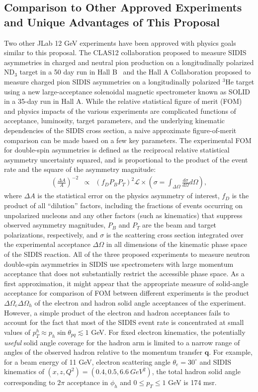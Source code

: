 \subsection{Comparison to Other Approved Experiments and Unique Advantages of This Proposal}
Two other JLab 12 GeV experiments have been approved with physics goals similar to this proposal. The CLAS12 collaboration proposed to measure SIDIS asymmetries in charged and neutral pion production on a longitudinally polarized ND$_3$ target in a 50 day run in Hall B~\cite{CLAS12_ND3_longitudinal} and the Hall A Collaboration proposed to measure charged pion SIDIS asymmetries on a longitudinally polarized $^3$He target using a new large-acceptance solenoidal magnetic spectrometer known as SOLID~\cite{SOLID_He3_longitudinal} in a 35-day run in Hall A. While the relative statistical figure of merit (FOM) and physics impacts of the various experiments are complicated functions of acceptance, luminosity, target parameters, and the underlying kinematic dependencies of the SIDIS cross section, a naive approximate figure-of-merit comparison can be made based on a few key parameters. The experimental FOM for double-spin asymmetries is defined as the reciprocal relative statistical asymmetry uncertainty squared, and is proportional to the product of the event rate and the square of the asymmetry magnitude: 
\begin{eqnarray}
  \left(\frac{\Delta A}{A}\right)^{-2} &\propto& (f_D P_B P_T)^2 \mathcal{L} \times \left( \sigma = \int_{\Delta \Omega} \frac{d\sigma}{d\Omega} d \Omega \right), 
\end{eqnarray} 
where $\Delta A$ is the statistical error on the physics asymmetry of interest, $f_D$ is the product of all ``dilution'' factors, including the fractions of events occurring on unpolarized nucleons and any other factors (such as kinematics) that suppress observed asymmetry magnitudes, $P_B$ and $P_T$ are the beam and target polarizations, respectively, and $\sigma$ is the scattering cross section integrated over the experimental acceptance $\Delta \Omega$ in all dimensions of the kinematic phase space of the SIDIS reaction. All of the three proposed experiments to measure neutron double-spin asymmetries in SIDIS use spectrometers with large momentum acceptance that does not substantially restrict the accessible phase space. As a first approximation, it might appear that the appropriate measure of solid-angle acceptance for comparison of FOM between different experiments is the product $\Delta \Omega_e \Delta \Omega_h$ of the electron and hadron solid angle acceptances of the experiment. However, a simple product of the electron and hadron acceptances fails to account for the fact that most of the SIDIS event rate is concentrated at small values of $p_T^h \approx p_h \sin \theta_{pq} \lesssim 1$ GeV. For fixed electron kinematics, the potentially \emph{useful} solid angle coverage for the hadron arm is limited to a narrow range of angles of the observed hadron relative to the momentum transfer $\mathbf{q}$. For example, for a beam energy of 11 GeV, electron scattering angle $\theta_e = 30^\circ$ and SIDIS kinematics of $(x,z,Q^2)=(0.4,0.5,6.6\ GeV^2)$, the total hadron solid angle corresponding to $2\pi$ acceptance in $\phi_h$ and $0 \le p_T \le 1$ GeV is 174 msr. 


